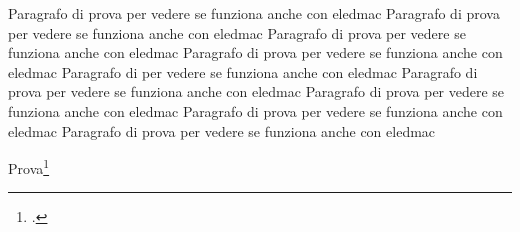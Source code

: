 \documentclass{book}
\makeatletter
\let\orig@@index\index
\newcommand\nindex[1]{\orig@@index{#1|innota}}
\makeatother
\begin{document}
\beginnumbering
\pstart
Paragrafo di prova per vedere se funziona anche con eledmac Paragrafo di prova per vedere se funziona anche con eledmac Paragrafo di prova per vedere se funziona anche con eledmac
Paragrafo di prova per vedere se funziona anche con eledmac
Paragrafo di  per vedere se funziona anche con eledmac
Paragrafo di prova per vedere se funziona anche con eledmac
Paragrafo di prova per vedere se funziona anche con eledmac
Paragrafo di prova per vedere se funziona anche con eledmac
Paragrafo di prova per vedere se funziona anche con eledmac
\pend
\endnumbering

Prova\footcite{bembo:donnini}


\printbibliography
\printindex
\end{document}
